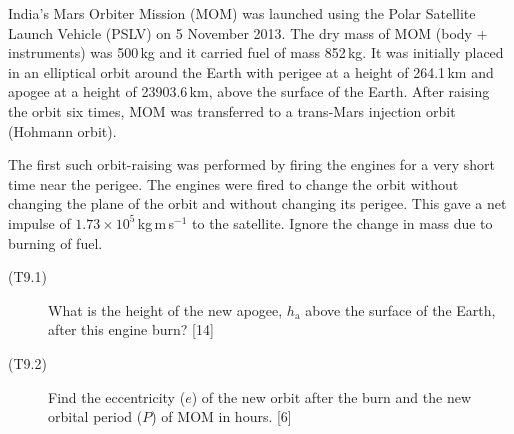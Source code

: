 India's Mars Orbiter Mission (MOM) was launched using the Polar Satellite
Launch Vehicle (PSLV) on 5 November 2013. The dry mass of MOM (body +
instruments) was 500\,kg and it carried fuel of mass 852\,kg. It was initially
placed in an elliptical orbit around the Earth with perigee at a height of
264.1\,km and apogee at a height of 23903.6\,km, above the surface of the
Earth. After raising the orbit six times, MOM was transferred to a trans-Mars
injection orbit (Hohmann orbit).

The first such orbit-raising was performed by firing the engines for a very
short time near the perigee. The engines were fired to change the orbit
without changing the plane of the orbit and without changing its perigee. This
gave a net impulse of $1.73 \times 10^5$\,kg\,m\,s$^{-1}$ to the satellite.
Ignore the change in mass due to burning of fuel.

\begin{description}
\item[(T9.1)] What is the height of the new apogee, $h_{\mathrm{a}}$ above the
  surface of the Earth, after this engine burn? \hfill[14]
\item[(T9.2)] Find the eccentricity ($e$) of the new orbit after the burn and
  the new orbital period ($P$) of MOM in hours. \hfill[6]
\end{description}
